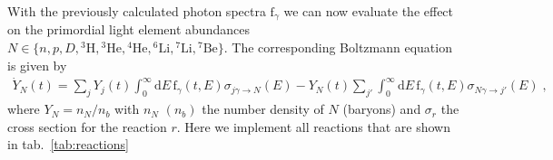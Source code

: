 \documentclass[11pt,a4paper]{article}
\newcommand{\fpdi}{\mathrm{f}}
\newcommand{\eqsp}{\;}
\begin{document}
With the previously calculated photon spectra $\fpdi_\gamma$ we can now evaluate the effect on the primordial light element abundances $N \in \{n, p, D, {}^3\mathrm{H}, {}^3\mathrm{He}, {}^4\mathrm{He}, {}^6\mathrm{Li}, {}^7\mathrm{Li}, {}^7\mathrm{Be} \}$. The corresponding Boltzmann equation is given by
\begin{align}
\dot{Y}_N(t) = \sum_{j} Y_{j}(t) \int_{0}^{\infty} \text{d} E \, \fpdi_\gamma(t, E)\sigma_{j\gamma \rightarrow N}(E) - Y_N(t) \sum_{j'} \int_{0}^{\infty} \text{d} E \, \fpdi_\gamma(t, E)\sigma_{N\gamma \rightarrow j'}(E)\eqsp,
\label{eq:y_pdi}
\end{align}
where $Y_N = n_N / n_b$ with $n_N$ $(n_b)$ the number density of $N$ (baryons) and $\sigma_r$ the cross section for the reaction $r$. Here we implement all reactions that are shown in tab.~\ref{tab:reactions}
\end{document}
